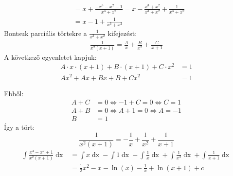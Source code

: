 \documentclass[a4paper,12pt]{article}
\theoremstyle{definition}
\begin{document}
\begin{solution}
\begin{tasks}
{\begin{align*}
					&= x +\frac{-x^3-x^2+1}{x^3+x^2} = x - \frac{x^3+x^2}{x^3+x^2} + \frac{1}{x^3+x^2} \\
					&= x - 1 + \frac{1}{x^3+x^2}
				\end{align*}
				Bontsuk parciális törtekre a $ \frac{1}{x^3+x^2} $ kifejezést:
				\begin{align*}
					\frac{1}{x^2(x+1)} = \frac{A}{x} + \frac{B}{x^2} + \frac{C}{x+1}
				\end{align*}
				A következő egyenletet kapjuk:
				\begin{align*}
					A \cdot x \cdot (x+1) + B \cdot (x+1) + C \cdot x^2 &= 1 \\
					Ax^2 + Ax + Bx + B + Cx^2 &= 1
				\end{align*}

				Ebből:
				\begin{align*}
					A + C &= 0 \iff -1 + C = 0 \iff C = 1 \\
					A + B &= 0 \iff A + 1 = 0 \iff A = -1 \\ 
					B &= 1
				\end{align*}
				Így a tört:
				\[
					\frac{1}{x^2(x+1)} = -\frac{1}{x} + \frac{1}{x^2} + \frac{1}{x+1}
				\]
				\begin{align*}
					\int{\frac{x^4-x^2+1}{x^2(x+1)} \mathop{dx}} &= \int{x \mathop{dx}} - \int{1 \mathop{dx}} - \int{\frac{1}{x} \mathop{dx}} + \int{\frac{1}{x^2} \mathop{dx}} + \int{\frac{1}{x+1} \mathop{dx}} \\
					&= \frac{1}{2}x^2 - x - \ln{(x)} - \frac{1}{x} + \ln{(x+1)} + c
				\end{align*}
			}
\end{tasks}
\end{solution}
\end{document}
